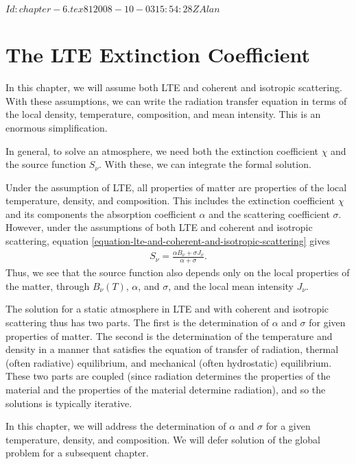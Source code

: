 
\svnInfo $Id: chapter-6.tex 81 2008-10-03 15:54:28Z Alan $

\newcommand{\crosssection}{a}

\chapter{The LTE Extinction Coefficient}
\label{chapter-lte-opacity-and-emissivity}

 In this chapter, we will assume both LTE and coherent and isotropic scattering. With these assumptions, we can write the radiation transfer equation in terms of the local density, temperature, composition, and mean intensity. This is an enormous simplification. 

\newslide

In general, to solve an atmosphere, we need both the extinction coefficient $\chi$ and the source function $S_\nu$. With these, we can integrate the formal solution. 

Under the assumption of LTE, all properties of matter are properties of the local temperature, density, and composition. This includes the extinction coefficient $\chi$ and its components the absorption coefficient $\alpha$ and the scattering coefficient $\sigma$.
However, under the assumptions of both LTE and coherent and isotropic scattering, equation \ref{equation-lte-and-coherent-and-isotropic-scattering} gives
\begin{align}
S_\nu = \frac{\alpha B_\nu + \sigma J_\nu}{\alpha + \sigma}.
\end{align}
Thus, we see that the source function also depends only on the local properties of the matter, through $B_\nu(T)$, $\alpha$, and $\sigma$, and the local mean intensity $J_\nu$.

The solution for a static atmosphere in LTE and with coherent and isotropic scattering thus has two parts. The first is the determination of $\alpha$ and $\sigma$ for given properties of matter. The second is the determination of the temperature and density in a manner that satisfies the equation of transfer of radiation, thermal (often radiative) equilibrium, and mechanical (often hydrostatic) equilibrium. These two parts are coupled (since radiation determines the properties of the material and the properties of the material determine radiation), and so the solutions is typically iterative.

In this chapter, we will address the determination of $\alpha$ and $\sigma$ for a given temperature, density, and composition. We will defer solution of the global problem for a subsequent chapter.

